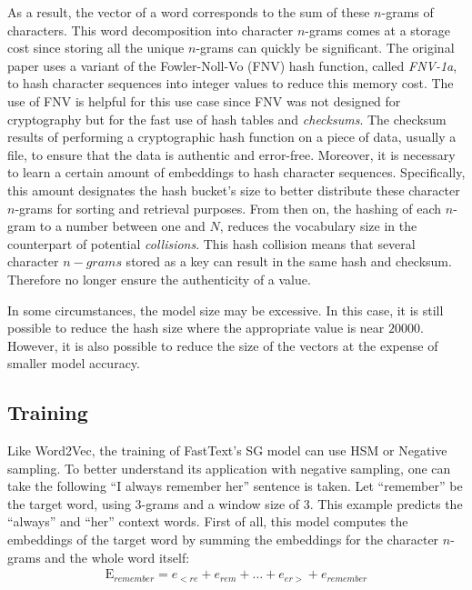 As a result, the vector of a word corresponds to the sum of these $n$-grams of
characters. This word decomposition into character $n$-grams comes at a storage
cost since storing all the unique $n$-grams can quickly be significant. The
original paper uses a variant of the Fowler-Noll-Vo (FNV) hash function, called
\emph{FNV-1a}, to hash character sequences into integer values to reduce this
memory cost. The use of FNV is helpful for this use case since FNV was not
designed for cryptography but for the fast use of hash tables and
\emph{checksums}. The checksum results of performing a cryptographic hash
function on a piece of data, usually a file, to ensure that the data is
authentic and error-free. Moreover, it is necessary to learn a certain amount of
embeddings to hash character sequences. Specifically, this amount designates the
hash bucket's size to better distribute these character $n$-grams for sorting
and retrieval purposes. From then on, the hashing of each $n$-gram to a number
between one and $N$, reduces the vocabulary size in the counterpart of potential
\emph{collisions}. This hash collision means that several character $n-grams$
stored as a key can result in the same hash and checksum. Therefore no longer
ensure the authenticity of a value.

In some circumstances, the model size may be excessive. In this case, it is
still possible to reduce the hash size where the appropriate value is near
$20000$. However, it is also possible to reduce the size of the vectors at the
expense of smaller model accuracy.

\subsection{Training}
\label{subsec:fasttext:training}

Like Word2Vec, the training of FastText’s SG model can use HSM or Negative
sampling. To better understand its application with negative sampling, one can
take the following ``I always remember her'' sentence is taken. Let ``remember''
be the target word, using 3-grams and a window size of 3. This example predicts
the ``always'' and ``her'' context words. First of all, this model computes the
embeddings of the target word by summing the embeddings for the character
$n$-grams and the whole word itself:
\begin{align}
  \mathrm{E}_{remember} = e_{<re} + e_{rem} + \dots + e_{er>} + e_{remember}
  \label{eq:fasttext:embeddings}
\end{align}

